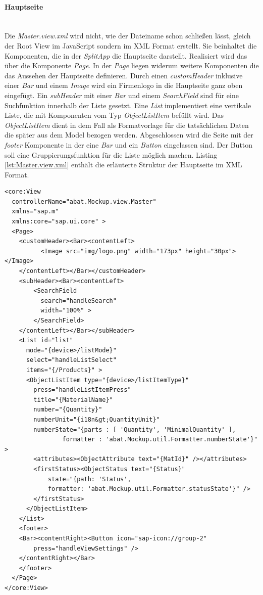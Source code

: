 \paragraph{Hauptseite}$\;$ \\
Die \textit{Master.view.xml} wird nicht, wie der Dateiname schon schließen lässt, gleich der Root View im JavaScript sondern im XML Format erstellt. Sie beinhaltet die Komponenten, die in der \textit{SplitApp} die Hauptseite darstellt. Realisiert wird das über die Komponente \textit{Page}. In der \textit{Page} liegen widerum weitere Komponenten die das Aussehen der Hauptseite definieren. Durch einen \textit{customHeader} inklusive einer \textit{Bar} und einem \textit{Image} wird ein Firmenlogo in die Hauptseite ganz oben eingefügt. Ein \textit{subHeader} mit einer \textit{Bar} und einem \textit{SearchField} sind für eine Suchfunktion innerhalb der Liste gesetzt. Eine \textit{List} implementiert eine vertikale Liste, die mit Komponenten vom Typ \textit{ObjectListItem} befüllt wird. Das \textit{ObjectListItem} dient in dem Fall als Formatvorlage für die tatsächlichen Daten die später aus dem Model bezogen werden. Abgeschlossen wird die Seite mit der \textit{footer} Komponente in der eine \textit{Bar} und ein \textit{Button} eingelassen sind. Der Button soll eine Gruppierungsfunktion für die Liste möglich machen. Listing \ref{lst:Master.view.xml} enthält die erläuterte Struktur der Hauptseite im XML Format.

\vspace{1em}
\begin{lstlisting}[frame=htrbl, caption=Hauptseite der SplitApp, label=lst:Master.view.xml]
<core:View
  controllerName="abat.Mockup.view.Master"
  xmlns="sap.m"
  xmlns:core="sap.ui.core" >
  <Page>
    <customHeader><Bar><contentLeft>
          <Image src="img/logo.png" width="173px" height="30px"></Image>
    </contentLeft></Bar></customHeader>
    <subHeader><Bar><contentLeft>
        <SearchField
          search="handleSearch"
          width="100%" >
        </SearchField>
    </contentLeft></Bar></subHeader>
    <List id="list"
      mode="{device>/listMode}"
      select="handleListSelect"
      items="{/Products}" >
      <ObjectListItem type="{device>/listItemType}"
        press="handleListItemPress"
        title="{MaterialName}"
        number="{Quantity}"
        numberUnit="{i18n&gt;QuantityUnit}"
        numberState="{parts : [ 'Quantity', 'MinimalQuantity' ],
                formatter : 'abat.Mockup.util.Formatter.numberState'}" >
        <attributes><ObjectAttribute text="{MatId}" /></attributes>
        <firstStatus><ObjectStatus text="{Status}"
            state="{path: 'Status',
            formatter: 'abat.Mockup.util.Formatter.statusState'}" />
        </firstStatus>
      </ObjectListItem>
    </List>
    <footer>
    <Bar><contentRight><Button icon="sap-icon://group-2"
        press="handleViewSettings" />
    </contentRight></Bar>
    </footer>
  </Page>
</core:View>
\end{lstlisting}

